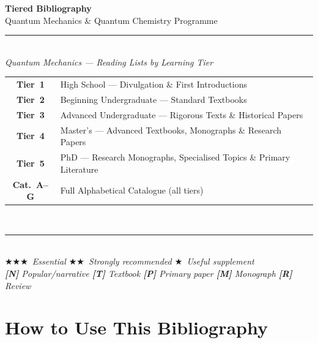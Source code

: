 \documentclass[11pt,a4paper]{article}
\newcommand{\essential}{$\bigstar\bigstar\bigstar$}
\newcommand{\recommended}{$\bigstar\bigstar$}
\newcommand{\useful}{$\bigstar$}
\begin{document}

\begin{titlepage}
\pagecolor{darkblue}\color{white}
\vspace*{2.5cm}
\begin{center}
  {\fontsize{28}{34}\selectfont\bfseries Tiered Bibliography}\\[0.4cm]
  {\fontsize{17}{22}\selectfont Quantum Mechanics \& Quantum Chemistry Programme}\\[0.5cm]
  {\color{accentgold}\rule{10cm}{2pt}}\\[0.5cm]
  {\large\itshape Quantum Mechanics --- Reading Lists by Learning Tier}\\[1.8cm]
  \begin{tabular}{@{}cl@{}}
    \colorbox{t1green}{\color{white}\bfseries Tier~1} & High School --- Divulgation \& First Introductions\\[3pt]
    \colorbox{t2blue}{\color{white}\bfseries Tier~2}  & Beginning Undergraduate --- Standard Textbooks\\[3pt]
    \colorbox{t3purple}{\color{white}\bfseries Tier~3} & Advanced Undergraduate --- Rigorous Texts \& Historical Papers\\[3pt]
    \colorbox{t4orange}{\color{white}\bfseries Tier~4} & Master's --- Advanced Textbooks, Monographs \& Research Papers\\[3pt]
    \colorbox{t5red}{\color{white}\bfseries Tier~5}   & PhD --- Research Monographs, Specialised Topics \& Primary Literature\\[6pt]
    \colorbox{catgray}{\color{white}\bfseries Cat.~A--G} & Full Alphabetical Catalogue (all tiers)\\
  \end{tabular}\\[1.8cm]
  {\color{accentgold}\rule{10cm}{1pt}}\\[0.4cm]
  {\small\itshape\essential\ Essential \quad \recommended\ Strongly recommended \quad \useful\ Useful supplement\\[3pt]
  \textbf{[N]} Popular/narrative \quad \textbf{[T]} Textbook \quad
  \textbf{[P]} Primary paper \quad \textbf{[M]} Monograph \quad \textbf{[R]} Review}
\end{center}
\vfill
\end{titlepage}
\nopagecolor

\tableofcontents
\newpage

\section*{How to Use This Bibliography}
\end{document}
